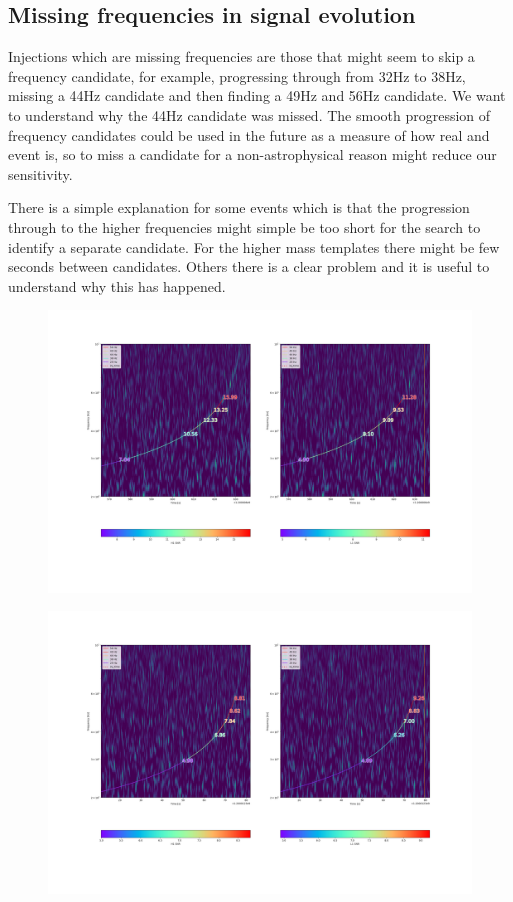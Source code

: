 \subsection{Missing frequencies in signal evolution}

Injections which are missing frequencies are those that might seem to skip a frequency candidate, for example, progressing through from 32Hz to 38Hz, missing a 44Hz candidate and then finding a 49Hz and 56Hz candidate. We want to understand why the 44Hz candidate was missed. The smooth progression of frequency candidates could be used in the future as a measure of how real and event is, so to miss a candidate for a non-astrophysical reason might reduce our sensitivity.

There is a simple explanation for some events which is that the progression through to the higher frequencies might simple be too short for the search to identify a separate candidate. For the higher mass templates there might be few seconds between candidates. Others there is a clear problem and it is useful to understand why this has happened.
%
\begin{figure}
       \centering
    \includegraphics[width=\textwidth]{images/ew/Missing_freqs_1.png}
    \caption{}
    \label{fig:ew_missing_freqs1}
\end{figure}
%
\begin{figure}
       \centering
    \includegraphics[width=\textwidth]{images/ew/missing_freqs.png}
    \caption{}
    \label{fig:ew_missing_freqs2}
\end{figure}
%
